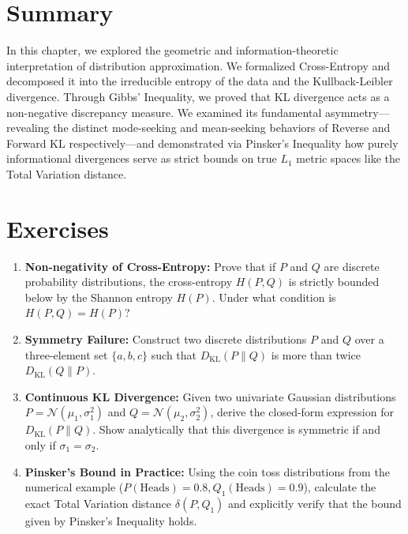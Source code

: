 \section{Summary}
In this chapter, we explored the geometric and information-theoretic interpretation of distribution approximation. We formalized Cross-Entropy and decomposed it into the irreducible entropy of the data and the Kullback-Leibler divergence. Through Gibbs' Inequality, we proved that KL divergence acts as a non-negative discrepancy measure. We examined its fundamental asymmetry---revealing the distinct mode-seeking and mean-seeking behaviors of Reverse and Forward KL respectively---and demonstrated via Pinsker's Inequality how purely informational divergences serve as strict bounds on true $L_1$ metric spaces like the Total Variation distance.

\section{Exercises}
\begin{enumerate}
    \item \textbf{Non-negativity of Cross-Entropy:} Prove that if $P$ and $Q$ are discrete probability distributions, the cross-entropy $H(P, Q)$ is strictly bounded below by the Shannon entropy $H(P)$. Under what condition is $H(P, Q) = H(P)$?
    \item \textbf{Symmetry Failure:} Construct two discrete distributions $P$ and $Q$ over a three-element set $\{a, b, c\}$ such that $D_{\text{KL}}(P \parallel Q)$ is more than twice $D_{\text{KL}}(Q \parallel P)$.
    \item \textbf{Continuous KL Divergence:} Given two univariate Gaussian distributions $P = \mathcal{N}(\mu_1, \sigma_1^2)$ and $Q = \mathcal{N}(\mu_2, \sigma_2^2)$, derive the closed-form expression for $D_{\text{KL}}(P \parallel Q)$. Show analytically that this divergence is symmetric if and only if $\sigma_1 = \sigma_2$.
    \item \textbf{Pinsker's Bound in Practice:} Using the coin toss distributions from the numerical example ($P(\text{Heads})=0.8, Q_1(\text{Heads})=0.9$), calculate the exact Total Variation distance $\delta(P, Q_1)$ and explicitly verify that the bound given by Pinsker's Inequality holds.
\end{enumerate}

